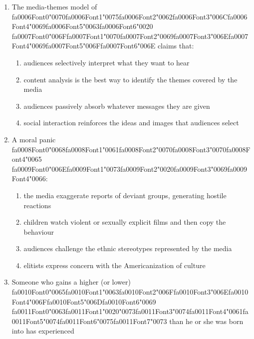 \documentclass[12pt]{article}
\begin{document}
\begin{enumerate}[label=\arabic*.]
\begin{enumerate}[label=(\alph*)]
    \item both boys and girls being closely attached to their fathers, but girls breaking away
\end{enumerate}
\item The media-themes model of {\csname fa0006Font0\endcsname\char"0070}{\csname fa0006Font1\endcsname\char"0075}{\csname fa0006Font2\endcsname\char"0062}{\csname fa0006Font3\endcsname\char"006C}{\csname fa0006Font4\endcsname\char"0069}{\csname fa0006Font5\endcsname\char"0063}{\csname fa0006Font6\endcsname\char"0020} {\csname fa0007Font0\endcsname\char"006F}{\csname fa0007Font1\endcsname\char"0070}{\csname fa0007Font2\endcsname\char"0069}{\csname fa0007Font3\endcsname\char"006E}{\csname fa0007Font4\endcsname\char"0069}{\csname fa0007Font5\endcsname\char"006F}{\csname fa0007Font6\endcsname\char"006E} claims that:
\begin{enumerate}[label=(\alph*)]
    \item audiences selectively interpret what they want to hear
    \item content analysis is the best way to identify the themes covered by the media
    \item audiences passively absorb whatever messages they are given
    \item social interaction reinforces the ideas and images that audiences select
\end{enumerate}
\item A moral panic {\csname fa0008Font0\endcsname\char"0068}{\csname fa0008Font1\endcsname\char"0061}{\csname fa0008Font2\endcsname\char"0070}{\csname fa0008Font3\endcsname\char"0070}{\csname fa0008Font4\endcsname\char"0065} {\csname fa0009Font0\endcsname\char"006E}{\csname fa0009Font1\endcsname\char"0073}{\csname fa0009Font2\endcsname\char"0020}{\csname fa0009Font3\endcsname\char"0069}{\csname fa0009Font4\endcsname\char"0066}:
\begin{enumerate}[label=(\alph*)]
    \item the media exaggerate reports of deviant groups, generating hostile reactions
    \item children watch violent or sexually explicit films and then copy the behaviour
    \item audiences challenge the ethnic stereotypes represented by the media
    \item elitists express concern with the Americanization of culture
\end{enumerate}
\item Someone who gains a higher (or lower) {\csname fa0010Font0\endcsname\char"0065}{\csname fa0010Font1\endcsname\char"0063}{\csname fa0010Font2\endcsname\char"006F}{\csname fa0010Font3\endcsname\char"006E}{\csname fa0010Font4\endcsname\char"006F}{\csname fa0010Font5\endcsname\char"006D}{\csname fa0010Font6\endcsname\char"0069} {\csname fa0011Font0\endcsname\char"0063}{\csname fa0011Font1\endcsname\char"0020}{\char"0073}{\csname fa0011Font3\endcsname\char"0074}{\csname fa0011Font4\endcsname\char"0061}{\csname fa0011Font5\endcsname\char"0074}{\csname fa0011Font6\endcsname\char"0075}{\csname fa0011Font7\endcsname\char"0073} than he or she was born into has experienced

\end{enumerate}
\end{document}
